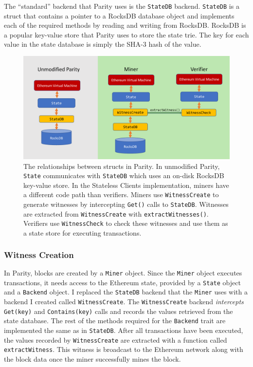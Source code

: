 \documentclass[12pt]{article}
\newcommand{\System}{Stateless Clients\xspace}
\begin{document}
The ``standard'' backend that Parity uses is the \texttt{StateDB} backend. \texttt{StateDB} is a struct that contains a pointer to a RocksDB database object and implements each of the required methods by reading and writing from RocksDB. RocksDB is a popular key-value store that Parity uses to store the state trie. The key for each value in the state database is simply the SHA-3 hash of the value.

\begin{figure}[H]
  \centering
  \includegraphics[width=\textwidth]{../figures/implementation/code_layout.pdf}
  \caption{The relationships between structs in Parity. In unmodified Parity, \texttt{State} communicates with \texttt{StateDB} which uses an on-disk RocksDB key-value store. In the \System implementation, miners have a different code path than verifiers. Miners use \texttt{WitnessCreate} to generate witnesses by intercepting \texttt{Get()} calls to \texttt{StateDB}. Witnesses are extracted from \texttt{WitnessCreate} with \texttt{extractWitnesses()}. Verifiers use \texttt{WitnessCheck} to check these witnesses and use them as a state store for executing transactions.}
  \label{fig:parityrelationships}
\end{figure}

\subsubsection{Witness Creation}

In Parity, blocks are created by a \texttt{Miner} object. Since the \texttt{Miner} object executes transactions, it needs access to the Ethereum state, provided by a \texttt{State} object and a \texttt{Backend} object. I replaced the \texttt{StateDB} backend that the \texttt{Miner} uses with a backend I created called \texttt{WitnessCreate}. The \texttt{WitnessCreate} backend \emph{intercepts} \texttt{Get(key)} and \texttt{Contains(key)} calls and records the values retrieved from the state database. The rest of the methods required for the \texttt{Backend} trait are implemented the same as in \texttt{StateDB}. After all transactions have been executed, the values recorded by \texttt{WitnessCreate} are extracted with a function called \texttt{extractWitness}. This witness is broadcast to the Ethereum network along with the block data once the miner successfully mines the block.
\end{document}
